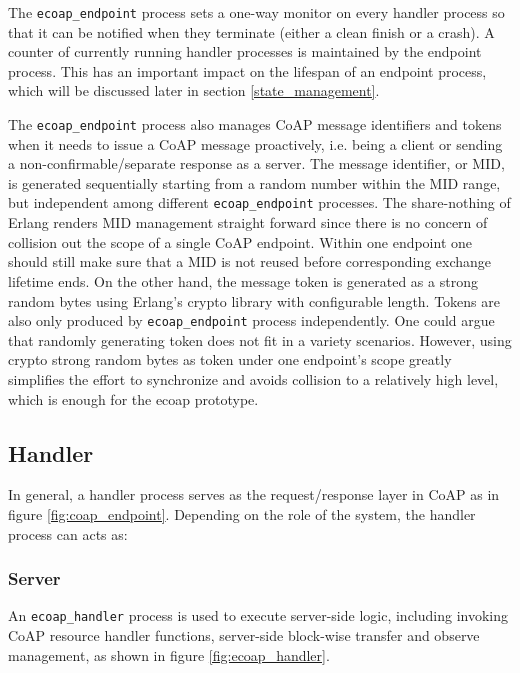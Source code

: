 The \verb|ecoap_endpoint| process sets a one-way monitor on every handler process so that it can be notified when they terminate (either a clean finish or a crash). A counter of currently running handler processes is maintained by the endpoint process. This has an important impact on the lifespan of an endpoint process, which will be discussed later in section \ref{state_management}. 

The \verb|ecoap_endpoint| process also manages CoAP message identifiers and tokens when it needs to issue a CoAP message proactively, i.e. being a client or sending a non-confirmable/separate response as a server. The message identifier, or MID, is generated sequentially starting from a random number within the MID range, but independent among different \verb|ecoap_endpoint| processes. The share-nothing of Erlang renders MID management straight forward since there is no concern of collision out the scope of a single CoAP endpoint. Within one endpoint one should still make sure that a MID is not reused before corresponding exchange lifetime ends. On the other hand, the message token is generated as a strong random bytes using Erlang's crypto library with configurable length. Tokens are also only produced by  \verb|ecoap_endpoint| process independently. One could argue that randomly generating token does not fit in a variety scenarios. However, using crypto strong random bytes as token under one endpoint's scope greatly simplifies the effort to synchronize and avoids collision to a relatively high level, which is enough for the ecoap prototype.

\subsection{Handler}\label{coap_handler}

In general, a handler process serves as the request/response layer in CoAP as in figure \ref{fig:coap_endpoint}. Depending on the role of the system, the handler process can acts as:

\subsubsection{Server}

An \verb|ecoap_handler| process is used to execute server-side logic, including invoking CoAP resource handler functions, server-side block-wise transfer and observe management, as shown in figure \ref{fig:ecoap_handler}. 

